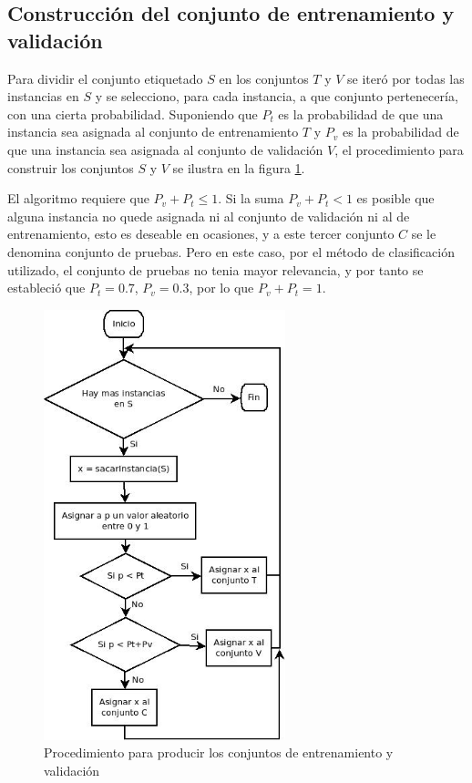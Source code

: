 \documentclass[a4paper, 11pt, oneside]{report}
\begin{document}
\subsection{Construcción del conjunto de entrenamiento y validación}
\label{sect:trainingSet}

Para dividir el conjunto etiquetado $S$ en los conjuntos $T$ y $V$ se iteró por todas las instancias en $S$ y se selecciono, para cada instancia, a que conjunto pertenecería, con una cierta probabilidad. Suponiendo que $P_t$ es la probabilidad de que una instancia sea asignada al conjunto de entrenamiento $T$ y $P_v$ es la probabilidad de que una instancia sea asignada al conjunto de validación $V$, el procedimiento para construir los conjuntos $S$ y $V$ se ilustra en la figura \ref{fig:setPartition}.

El algoritmo requiere que $P_v + P_t \le 1$. Si la suma $P_v + P_t < 1$ es posible que alguna instancia no quede asignada ni al conjunto de validación ni al de entrenamiento, esto es deseable en ocasiones, y a este tercer conjunto $C$ se le denomina conjunto de pruebas. Pero en este caso, por el método de clasificación utilizado, el conjunto de pruebas no tenia mayor relevancia, y por tanto se estableció que $P_t=0.7$, $P_v=0.3$, por lo que $P_v + P_t = 1$.

\begin{figure}[htb]
\begin{center}
\leavevmode
\includegraphics[width=7cm]{diagrams/setPartition.jpg}
\end{center}
\caption{Procedimiento para producir los conjuntos de entrenamiento y validación}
\label{fig:setPartition}
\end{figure}
\end{document}
